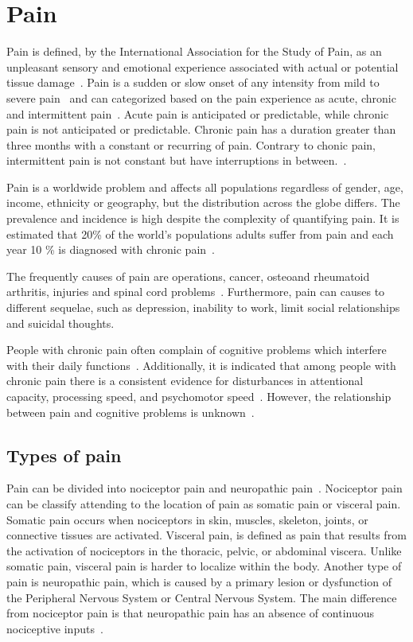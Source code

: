 \section{Pain}
Pain is defined, by the International Association for the Study of Pain, as an unpleasant sensory and emotional experience associated with actual or potential tissue damage~\cite{Marsky and Bogduk, 1994}. Pain is a sudden or slow onset of any intensity from mild to severe pain~\cite{Mello2016} and can categorized based on the pain experience as acute, chronic and intermittent pain~\cite{Goldberg2011}. Acute pain is anticipated or predictable, while  chronic pain is not anticipated or predictable. Chronic pain has a duration greater than three months with a constant or recurring of pain. Contrary to chonic pain, intermittent pain is not constant but have interruptions in between.~\cite{Mello2016}.

Pain is a worldwide problem and affects all populations regardless of gender, age, income, ethnicity or geography, but the distribution across the globe differs\cite{Goldberg2011}. 
The prevalence and incidence is high despite the complexity of quantifying pain\cite{Goldberg2011}. It is estimated that 20\% of the world's populations adults suffer from pain and each year 10 \% is diagnosed with chronic pain~\cite{Goldberg2011}. 

The frequently causes of pain are operations, cancer, osteoand rheumatoid arthritis, injuries and spinal cord problems~\cite{Goldberg2011}. Furthermore, pain can causes to different sequelae, such as depression, inability to work, limit social relationships and suicidal thoughts\cite{Goldberg2011}. 

People with chronic pain often complain of cognitive problems which interfere with their daily functions~\cite{Geisser2018}. Additionally, it is indicated that among people with chronic pain there is a consistent evidence for disturbances in attentional capacity, processing speed, and psychomotor speed~\cite{Geisser2018}. However, the relationship between pain and cognitive problems is unknown~\cite{Geisser2018}. 

\subsection{Types of pain}
Pain can be divided into nociceptor pain and neuropathic pain~\cite{Steeds2013}. Nociceptor pain can be classify attending to the location of pain as somatic pain or visceral pain. Somatic pain occurs when nociceptors in skin, muscles, skeleton, joints, or connective tissues are activated. Visceral pain, is defined as pain that results from the activation of nociceptors in the thoracic, pelvic, or abdominal viscera. Unlike somatic pain, visceral pain is harder to localize within the body. Another type of pain is neuropathic pain, which is caused by a primary lesion or dysfunction of the Peripheral Nervous System or Central Nervous System. The main difference from nociceptor pain is that neuropathic pain has an absence of continuous nociceptive inputs~\cite{neuropathic pain}.

